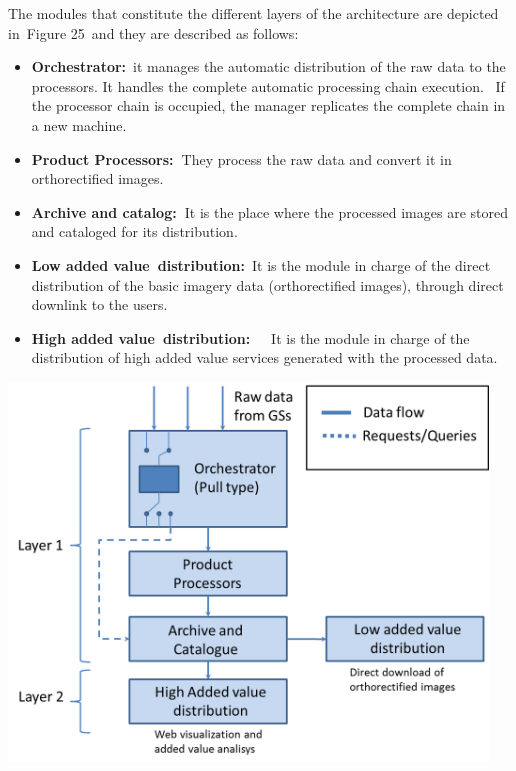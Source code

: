 \documentclass[a4paper]{article}
\newcommand\liststyleLFOxxiv{%
\renewcommand\labelitemi{[F0B7?]}
\renewcommand\labelitemii{o}
\renewcommand\labelitemiii{[F0A7?]}
\renewcommand\labelitemiv{[F0B7?]}
}
\begin{document}
\bigskip

The modules that constitute the different layers of the architecture are
depicted in\ Figure 25\ and they are described as follows:


\bigskip

\liststyleLFOxxiv
\begin{itemize}
\item \textbf{Orchestrator:}\ it manages the automatic distribution of
the raw data to the processors. It handles the complete automatic
processing chain execution. \ If the processor chain is occupied, the
manager replicates the complete chain in a new machine.
\item \textbf{Product Processors:\ }They process the raw data and
convert it in orthorectified images.\ 
\item \textbf{Archive and catalog:\ }It is the place where the processed
images are stored and cataloged for its distribution.
\item \textbf{Low added value\ }\textbf{distribution}\textbf{:}\ It is
the module in charge of the direct distribution of the basic imagery
data (orthorectified images), through direct downlink to the users.\ 
\item \textbf{High added value\ }\textbf{distribution}\textbf{:}\ \ \ It
is the module in charge of the distribution of high added value
services generated with the processed data.\ 
\end{itemize}

\bigskip

{\centering 
\includegraphics[width=5.01448in,height=3.96902in]{out-img33.png} \par}
\end{document}
